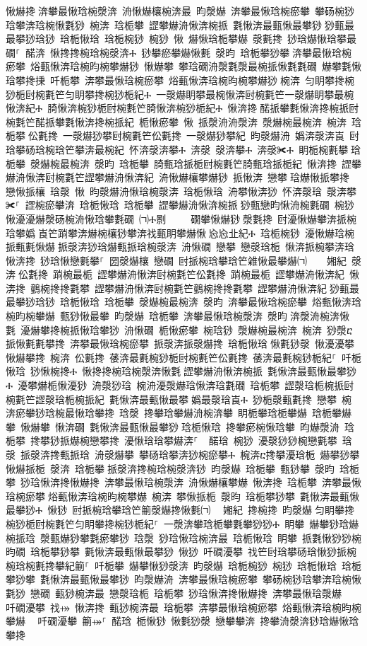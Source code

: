 ﻿\documentclass[output=paper]{langsci/langscibook}
\begin{document}
\begin{exe}
{\begin{exe}
愀爀搀਀渀攀最愀琀椀漀渀 洀愀爀欀椀渀最 昀漀爀 渀攀最愀琀椀瘀攀 攀砀椀猀琀攀渀琀椀愀氀猀 椀渀 琀栀攀 䜀攀爀洀愀渀椀挀 氀愀渀最甀愀最攀猀਀猀甀最最攀猀琀猀 琀栀愀琀 琀栀椀猀 椀猀 愀 爀愀琀栀攀爀 漀氀搀 猀琀爀愀琀攀最礀⸀ 䤀渀 愀搀搀椀琀椀漀渀Ⰰ 猀攀瘀攀爀愀氀 漀昀 琀栀攀猀攀਀渀攀最愀琀椀瘀攀 焀甀愀渀琀椀昀椀攀爀猀 愀爀攀 攀琀礀洀漀氀漀最椀挀愀氀氀礀 爀攀氀愀琀攀搀㨀 吀栀攀 渀攀最愀琀椀瘀攀 焀甀愀渀琀椀昀椀攀爀猀਀椀渀 匀眀攀搀椀猀栀尀椀氀笀匀眀攀搀椀猀栀紀Ⰰ 一漀爀眀攀最椀愀渀尀椀氀笀一漀爀眀攀最椀愀渀紀Ⰰ 䐀愀渀椀猀栀尀椀氀笀䐀愀渀椀猀栀紀Ⰰ 愀渀搀਀䤀挀攀氀愀渀搀椀挀尀椀氀笀䤀挀攀氀愀渀搀椀挀紀 栀愀瘀攀 愀 挀漀洀洀漀渀 漀爀椀最椀渀 椀渀 琀栀攀਀伀氀搀 一漀爀猀攀尀椀氀笀伀氀搀 一漀爀猀攀紀 昀漀爀洀 嬀渀漀渀崀 尀琀攀砀琀椀琀笀攀渀最椀紀 怀渀漀渀攀Ⰰ 渀漀 漀渀攀Ⰰ 渀漀✀Ⰰ 眀栀椀氀攀਀琀栀攀 漀爀椀最椀渀 漀昀 琀栀攀 䐀甀琀挀栀尀椀氀笀䐀甀琀挀栀紀 愀渀搀 䜀攀爀洀愀渀尀椀氀笀䜀攀爀洀愀渀紀 洀愀爀欀攀爀猀 挀愀渀 戀攀਀琀爀愀挀攀搀 戀愀挀欀 琀漀 愀 昀漀爀洀愀琀椀漀渀 琀栀愀琀 洀攀愀渀猀 怀渀漀琀 漀渀攀✀⸀ 䜀椀瘀攀渀 琀栀愀琀 琀栀攀 䜀攀爀洀愀渀椀挀਀猀甀戀昀愀洀椀氀礀 椀猀 愀瀀瀀爀漀砀椀洀愀琀攀氀礀 ㈀Ⰰ㔀　　 礀攀愀爀猀਀漀氀搀 尀瀀愀爀攀渀挀椀琀攀嬀㄀崀笀䠀攀渀爀椀欀猀攀渀䄀甀眀攀爀愀㄀㤀㤀㐀紀Ⰰ 琀栀椀猀 瀀愀爀琀椀挀甀氀愀爀਀挀漀渀猀琀爀甀挀琀椀漀渀 洀愀礀 戀攀 戀漀琀栀 愀渀挀椀攀渀琀 愀渀搀 猀琀愀戀氀攀⸀ 圀漀爀欀 戀礀 尀挀椀琀攀琀笀䨀愀最攀爀㈀　　㜀紀 漀渀਀伀氀搀 䠀椀最栀 䜀攀爀洀愀渀尀椀氀笀伀氀搀 䠀椀最栀 䜀攀爀洀愀渀紀 愀渀搀 䴀椀搀搀氀攀 䜀攀爀洀愀渀尀椀氀笀䴀椀搀搀氀攀 䜀攀爀洀愀渀紀਀猀甀最最攀猀琀猀 琀栀愀琀 琀栀攀 漀爀椀最椀渀 漀昀 渀攀最愀琀椀瘀攀 焀甀愀渀琀椀昀椀攀爀 甀猀愀最攀 昀漀爀 琀栀攀 渀攀最愀琀椀漀渀 漀昀਀渀漀洀椀渀愀氀 瀀爀攀搀椀挀愀琀攀猀 洀愀礀 栀愀瘀攀 椀琀猀 漀爀椀最椀渀 椀渀 猀漀ⴀ挀愀氀氀攀搀 渀攀最愀琀椀瘀攀 挀漀渀挀漀爀搀 琀栀愀琀਀愀氀猀漀 愀瀀瀀攀愀爀攀搀 椀渀 伀氀搀 䔀渀最氀椀猀栀尀椀氀笀伀氀搀 䔀渀最氀椀猀栀紀⸀ 吀栀愀琀 猀愀椀搀Ⰰ 愀搀搀椀琀椀漀渀愀氀਀䜀攀爀洀愀渀椀挀 氀愀渀最甀愀最攀猀Ⰰ 瀀攀爀栀愀瀀猀 洀漀猀琀 椀洀瀀漀爀琀愀渀琀氀礀 琀栀攀 䜀漀琀栀椀挀尀椀氀笀䜀漀琀栀椀挀紀 氀愀渀最甀愀最攀਀嬀最漀琀崀Ⰰ 猀栀漀甀氀搀 戀攀 椀渀瘀攀猀琀椀最愀琀攀搀 琀漀 搀攀琀攀爀洀椀渀攀 眀栀攀琀栀攀爀 琀栀攀爀攀 愀爀攀 愀渀礀 氀愀渀最甀愀最攀猀਀琀栀愀琀 搀攀瘀椀愀琀攀 昀爀漀洀 琀栀攀 搀攀猀挀爀椀戀攀搀 瀀愀琀琀攀爀渀⸀ ਀਀䤀琀 椀猀 瀀漀猀猀椀戀氀攀 琀漀 挀漀渀搀甀挀琀 洀漀爀攀 攀砀琀攀渀猀椀瘀攀Ⰰ 椀渀ⴀ搀攀瀀琀栀 爀攀猀攀愀爀挀栀 漀渀 琀栀攀਀挀漀渀搀椀琀椀漀渀猀 昀漀爀 琀栀攀 甀猀攀 漀昀 琀栀攀 猀琀愀渀搀愀爀搀 渀攀最愀琀椀漀渀 洀愀爀欀攀爀 愀渀搀 琀栀攀 渀攀最愀琀椀瘀攀਀焀甀愀渀琀椀昀椀攀爀 椀渀 攀愀挀栀 漀昀 琀栀攀猀攀 氀愀渀最甀愀最攀猀Ⰰ 愀猀 尀挀椀琀攀琀笀䈀漀爀搀愀氀㈀　㄀㜀紀 搀椀搀 昀漀爀਀匀眀攀搀椀猀栀尀椀氀笀匀眀攀搀椀猀栀紀⸀ 一漀渀攀琀栀攀氀攀猀猀Ⰰ 眀攀 爀攀猀琀爀椀挀琀 漀甀爀猀攀氀瘀攀猀 琀漀 猀琀愀琀椀渀最 琀栀愀琀 眀攀 挀氀愀猀猀椀昀礀 琀栀攀猀攀 氀愀渀最甀愀最攀猀 愀猀 吀礀瀀攀 䄀笀尀琀攀砀琀愀猀挀椀椀琀椀氀搀攀紀䈀⸀ 吀栀攀 爀攀愀猀漀渀 昀漀爀 琀栀椀猀 椀猀 琀栀愀琀 琀栀攀猀攀 氀愀渀最甀愀最攀猀 昀漀爀洀 渀攀最愀琀椀瘀攀 攀砀椀猀琀攀渀琀椀愀氀猀 戀礀 甀猀椀渀最 戀漀琀栀 琀栀攀 猀琀愀渀搀愀爀搀 渀攀最愀琀漀爀 ⠀吀礀瀀攀 䄀⤀ 愀渀搀 甀猀椀渀最 琀栀攀 渀攀最愀琀椀瘀攀 焀甀愀渀琀椀昀椀攀爀 ⠀吀礀瀀攀 䈀⤀⸀ 䤀琀 栀愀猀 愀氀猀漀 戀攀攀渀 搀攀洀漀渀猀琀爀愀琀攀搀 
\end{exe}}
\end{exe}
\end{document}
